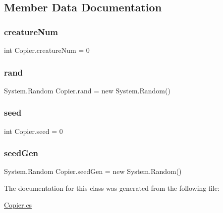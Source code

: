 \subsection{Member Data Documentation}
\mbox{\label{class_copier_ab7101a9420cdd74139f3c83d9ec8ed25}} 
\subsubsection{\texorpdfstring{creature\+Num}{creatureNum}}
{\footnotesize\ttfamily int Copier.\+creature\+Num = 0\hspace{0.3cm}{\ttfamily [static]}}

\mbox{\label{class_copier_ac2bbed854907158508f714b65783418e}} 
\subsubsection{\texorpdfstring{rand}{rand}}
{\footnotesize\ttfamily System.\+Random Copier.\+rand = new System.\+Random()\hspace{0.3cm}{\ttfamily [static]}}

\mbox{\label{class_copier_a5f70131c00bf001cc92dd4cee4a80540}} 
\subsubsection{\texorpdfstring{seed}{seed}}
{\footnotesize\ttfamily int Copier.\+seed = 0\hspace{0.3cm}{\ttfamily [static]}}

\mbox{\label{class_copier_a74089df571f0e9ffadd5879bf0199dac}} 
\subsubsection{\texorpdfstring{seed\+Gen}{seedGen}}
{\footnotesize\ttfamily System.\+Random Copier.\+seed\+Gen = new System.\+Random()\hspace{0.3cm}{\ttfamily [static]}}



The documentation for this class was generated from the following file\+:\begin{DoxyCompactItemize}
\item 
\mbox{\hyperlink{_copier_8cs}{Copier.\+cs}}\end{DoxyCompactItemize}
